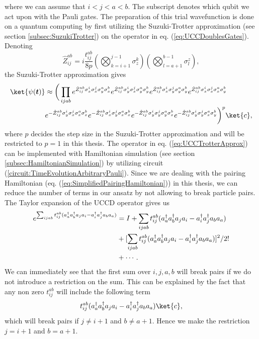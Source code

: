 where we can assume that $i < j < a < b$. The subscript denotes which qubit we act upon with the Pauli gates.
The preparation of this trial wavefunction is done on a quantum computing by first utilizing the Suzuki-Trotter approximation (see section \ref{subsec:SuzukiTrotter}) on the operator in eq. (\ref{eq:UCCDoublesGates}). Denoting 
$$\hat{Z}_{ij}^{ab} =i\frac{t_{ij}^{ab}}{8p}(\bigotimes_{k=i+1}^{j-1}\sigma_z^k)(\bigotimes_{l=a+1}^{b-1}\sigma_l^z),$$ 
the Suzuki-Trotter approximation gives
\begin{align}
    \label{eq:UCCTrotterApprox}
    \ket{\psi(\boldsymbol{t})} &\approx  \bigg( \prod_{ijab} e^{\hat{Z}_{ij}^{ab}\sigma_x^i \sigma_x^j \sigma_y^a \sigma_x^b }
    e^{\hat{Z}_{ij}^{ab}\sigma_y^i \sigma_x^j \sigma_y^a \sigma_y^b }
    e^{\hat{Z}_{ij}^{ab}\sigma_x^i\sigma_y^j \sigma_y^a \sigma_y^b }
    e^{\hat{Z}_{ij}^{ab}\sigma_x^i \sigma_x^j \sigma_x^a \sigma_y^b } \notag \\
    &e^{-\hat{Z}_{ij}^{ab}\sigma_y^i \sigma_x^j \sigma_x^a \sigma_x^b }
    e^{-\hat{Z}_{ij}^{ab}\sigma_x^i \sigma_y^j \sigma_x^a \sigma_x^b }
    e^{-\hat{Z}_{ij}^{ab}\sigma_y^i \sigma_y^j \sigma_y^a \sigma_x^b }
    e^{-\hat{Z}_{ij}^{ab}\sigma_y^i \sigma_y^j \sigma_x^a \sigma_y^b }
    \bigg)^p \ket{c},
\end{align}
where $p$ decides the step size in the Suzuki-Trotter approximation and will be restricted to $p=1$ in this thesis. The operator in eq. (\ref{eq:UCCTrotterApprox}) can be implemented with Hamiltonian simulation (see section \ref{subsec:HamiltonianSimulation}) by utilizing circuit (\ref{circuit:TimeEvolutionArbitraryPauli}).
Since we are dealing with the pairing Hamiltonian (eq. (\ref{eq:SimplifiedPairingHamiltonian})) in this thesis, we can reduce the number of terms in our ansatz by not allowing to break particle pairs. The Taylor expansion of the UCCD operator gives us
\begin{align}
    e^{\sum_{ijab} t_{ij}^{ab}(a^\dagger_a a^\dagger_b a_j a_i - a^\dagger_i a^\dagger_j a_b a_a)} &= I + \sum_{ijab} t_{ij}^{ab}(a^\dagger_a a^\dagger_b a_j a_i - a^\dagger_i a^\dagger_j a_b a_a) \notag \\
    & + [\sum_{ijab} t_{ij}^{ab}(a^\dagger_a a^\dagger_b a_j a_i - a^\dagger_i a^\dagger_j a_b a_a)]^2/2! \notag \\
    &+ \cdots.
\end{align}
We can immediately see that the first sum over $i,j,a,b$ will break pairs if we do not introduce a restriction on the sum. This can be explained by the fact that any non zero $t_{ij}^{ab}$ will include the following term
$$
t_{ij}^{ab}(a^\dagger_a a^\dagger_b a_j a_i - a^\dagger_i a^\dagger_j a_b a_a)\ket{c},
$$
which will break pairs if $j \neq i+1$ and $b \neq a+1$. 
Hence we make the restriction $j = i+1$ and $b = a+1$.

